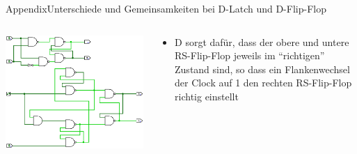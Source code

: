 \begin{frame}{Appendix}{Unterschiede und Gemeinsamkeiten bei D-Latch und D-Flip-Flop}
  \begin{columns}
    \begin{column}{0.4\textwidth}
      \includegraphics[width=0.6\paperheight, center]{./figures/00X.png}
    \end{column}
    \begin{column}{0.6\textwidth}
      \begin{itemize}
        \item \alert{D} sorgt dafür, dass der \alert{obere und untere RS-Flip-Flop} jeweils im \alert{\enquote{richtigen} Zustand} sind, so dass ein Flankenwechsel der Clock auf 1 den \alert{rechten RS-Flip-Flop} richtig einstellt 
      \end{itemize}
    \end{column}
  \end{columns}
\end{frame}
